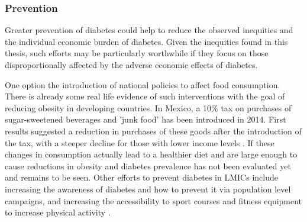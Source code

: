 \subsubsection{Prevention}

Greater prevention of diabetes could help to reduce the observed inequities and the individual economic burden of diabetes. Given the inequities found in this thesis, such efforts may be particularly worthwhile if they focus on those disproportionally affected by the adverse economic effects of diabetes.

One option \DIFdelbegin {}\DIFdelend \DIFaddbegin {}\DIFaddend the introduction of national policies to affect food consumption. There is already some real life evidence of such interventions with the goal of reducing obesity in developing countries. In Mexico, a 10\% tax on purchases of sugar-sweetened beverages and 'junk food' has been introduced in 2014. First results suggested a reduction in purchases of these goods after the introduction of the tax, with a steeper decline for those with lower income levels \parencite{Colchero2016,Batis2016}. If these changes in consumption actually lead to a healthier diet and are large enough to cause reductions in obesity and diabetes prevalence has not been evaluated yet and remains to be seen. Other efforts to prevent diabetes in \acp{LMIC} include increasing the awareness of diabetes and how to prevent it via population level campaigns, and  increasing the accessibility to sport courses and fitness equipment to increase physical activity \parencite{Cefalu2016} . 

